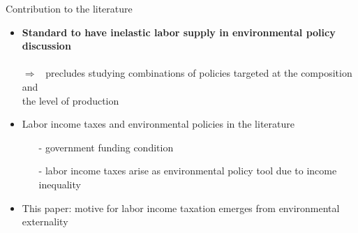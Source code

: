 \documentclass[11pt,aspectratio=169]{beamer}
\newcommand{\ar}{$\Rightarrow$ \ }
\begin{document}
\begin{frame}{Contribution to the literature}
	\begin{itemize}[<+->]
		\item \alert{\textbf{Standard to have inelastic labor supply in environmental policy discussion}}\\  \footnotesize{ \citep{Acemoglu2012TheChange, Golosov2014OptimalEquilibrium, Acemoglu2016TransitionTechnology, Fried2018ClimateAnalysis, Hart2019TheEconomists}}
		\\  \normalsize{\alert{\ar precludes studying combinations of policies targeted at the composition and\\ \hspace{5mm} the level of production }}
		\vspace{2mm}
		\item \alert{Labor income taxes and environmental policies in the literature}
		\begin{itemize}
			\item[-]  government funding condition%
			 \footnotesize{ \citep{ LansBovenberg1994EnvironmentalTaxation, Goulder1995EnvironmentalGuide, Barrage2019OptimalPolicy}} %
			\item[-] labor income taxes arise as environmental policy tool due to {income inequality} \footnotesize{\citep{Jacobs2019RedistributionCurves, Dobkowitz2022, Douenne2022OptimalHouseholds}}
		\end{itemize}		
		\vspace{2mm}
		\item \alert{This paper}: motive for labor income taxation emerges from environmental externality %

\end{itemize}
\end{frame}
\end{document}
